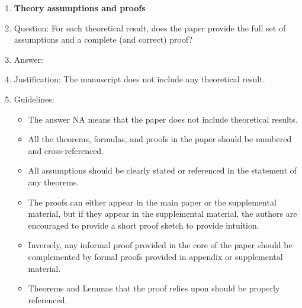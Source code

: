 \documentclass{article}
\begin{document}
\begin{enumerate}
\begin{itemize}
        \item If applicable, the authors should discuss possible limitations of their approach to address problems of privacy and fairness.
        \item While the authors might fear that complete honesty about limitations might be used by reviewers as grounds for rejection, a worse outcome might be that reviewers discover limitations that aren't acknowledged in the paper. The authors should use their best judgment and recognize that individual actions in favor of transparency play an important role in developing norms that preserve the integrity of the community. Reviewers will be specifically instructed to not penalize honesty concerning limitations.
    \end{itemize}

\item {\bf Theory assumptions and proofs}
    \item[] Question: For each theoretical result, does the paper provide the full set of assumptions and a complete (and correct) proof?
    \item[] Answer: \answerNA{} %
    \item[] Justification: The manuscript does not include any theoretical result.
    \item[] Guidelines:
    \begin{itemize}
        \item The answer NA means that the paper does not include theoretical results. 
        \item All the theorems, formulas, and proofs in the paper should be numbered and cross-referenced.
        \item All assumptions should be clearly stated or referenced in the statement of any theorems.
        \item The proofs can either appear in the main paper or the supplemental material, but if they appear in the supplemental material, the authors are encouraged to provide a short proof sketch to provide intuition. 
        \item Inversely, any informal proof provided in the core of the paper should be complemented by formal proofs provided in appendix or supplemental material.
        \item Theorems and Lemmas that the proof relies upon should be properly referenced. 
    \end{itemize}


\end{enumerate}
\end{document}
